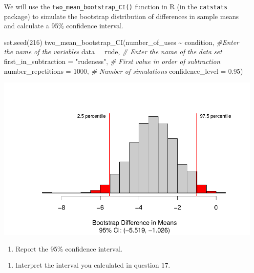 \documentclass[
]{report}
\newenvironment{Shaded}{\begin{snugshade}}{\end{snugshade}}
\newcommand{\AttributeTok}[1]{\textcolor[rgb]{0.77,0.63,0.00}{#1}}
\newcommand{\CommentTok}[1]{\textcolor[rgb]{0.56,0.35,0.01}{\textit{#1}}}
\newcommand{\DecValTok}[1]{\textcolor[rgb]{0.00,0.00,0.81}{#1}}
\newcommand{\FloatTok}[1]{\textcolor[rgb]{0.00,0.00,0.81}{#1}}
\newcommand{\FunctionTok}[1]{\textcolor[rgb]{0.00,0.00,0.00}{#1}}
\newcommand{\NormalTok}[1]{#1}
\newcommand{\SpecialCharTok}[1]{\textcolor[rgb]{0.00,0.00,0.00}{#1}}
\newcommand{\StringTok}[1]{\textcolor[rgb]{0.31,0.60,0.02}{#1}}
\providecommand{\tightlist}{%
  \setlength{\itemsep}{0pt}\setlength{\parskip}{0pt}}
\begin{document}
We will use the \texttt{two\_mean\_bootstrap\_CI()} function in R (in the \texttt{catstats} package) to simulate the bootstrap distribution of differences in sample means and calculate a 95\% confidence interval.

\begin{Shaded}
\begin{Highlighting}[]
\FunctionTok{set.seed}\NormalTok{(}\DecValTok{216}\NormalTok{)}
\FunctionTok{two\_mean\_bootstrap\_CI}\NormalTok{(number\_of\_uses }\SpecialCharTok{\textasciitilde{}}\NormalTok{ condition, }\CommentTok{\#Enter the name of the variables}
                      \AttributeTok{data =}\NormalTok{ rude,  }\CommentTok{\# Enter the name of the data set}
                      \AttributeTok{first\_in\_subtraction =} \StringTok{"rudeness"}\NormalTok{, }\CommentTok{\# First value in order of subtraction}
                      \AttributeTok{number\_repetitions =} \DecValTok{1000}\NormalTok{,  }\CommentTok{\# Number of simulations}
                      \AttributeTok{confidence\_level =} \FloatTok{0.95}\NormalTok{)}
\end{Highlighting}
\end{Shaded}

\begin{center}\includegraphics[width=0.7\linewidth]{12-OCA09-inference-1ofeach-simulation_files/figure-latex/unnamed-chunk-5-1} \end{center}

\begin{enumerate}
\def\labelenumi{\arabic{enumi}.}
\setcounter{enumi}{16}
\tightlist
\item
  Report the 95\% confidence interval.
\end{enumerate}

\vspace{0.3in}

\begin{enumerate}
\def\labelenumi{\arabic{enumi}.}
\setcounter{enumi}{17}
\tightlist
\item
  Interpret the interval you calculated in question 17.
\end{enumerate}
\end{document}
